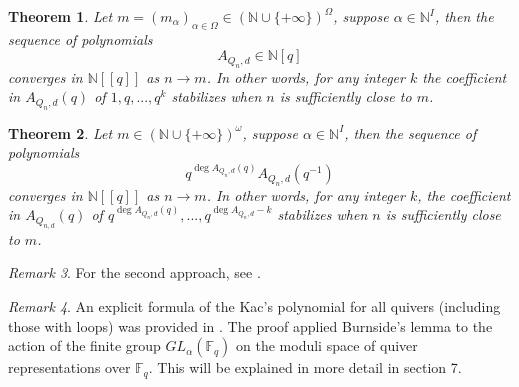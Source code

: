 \documentclass[12pt]{amsart}
\theoremstyle{plain}
\newtheorem{thm}{Theorem}[section]
\theoremstyle{definition}
\theoremstyle{remark}
\newtheorem{rem}[thm]{Remark}
\begin{document}
\begin{thm}
    \cite[Theorem 3.2]{hennecart2021asymptotic} Let $m=(m_{\alpha})_{\alpha\in\Omega}\in (\mathbb N\cup\{+\infty\})^{\Omega}$, suppose $\alpha\in\mathbb N^I$, then the sequence of polynomials 
    $$A_{Q_{n},d}\in\mathbb N[q]$$
    converges in $\mathbb N[[q]]$ as $n\to m$. In other words, for any integer $k$ the coefficient in $A_{Q_n,d}(q)$ of $1,q,...,q^k$ stabilizes when $n$ is sufficiently close to $m$.
\end{thm}
\begin{thm}
\cite[Theorem 3.7]{hennecart2021asymptotic} Let $m\in(\mathbb N\cup\{+\infty\})^{\omega}$, suppose $\alpha\in \mathbb N^I$, then the sequence of polynomials 
$$q^{\deg A_{Q_n,d}(q)}A_{Q_n,d}(q^{-1})$$
converges in $\mathbb N[[q]]$ as $n\to m$. In other words, for any integer $k$, the coefficient in $A_{Q_{n,d}}(q)$ of $q^{\deg A_{Q_n,d}(q)},...,q^{\deg A_{Q_n,d}-k}$ stabilizes when $n$ is sufficiently close to $m$.
\end{thm}
\begin{rem}
    For the second approach, see \cite{zveryk2025stabilisation}.
\end{rem}
\begin{rem}
An explicit formula of the Kac's polynomial for all quivers (including those with loops) was provided in \cite[Theorem 4.6]{hua2000counting}. The proof applied Burnside's lemma to the action of the finite group $GL_{\alpha}(\mathbb F_q)$ on the moduli space of quiver representations over $\mathbb F_q$. This will be explained in more detail in section 7.
\end{rem}
\end{document}
